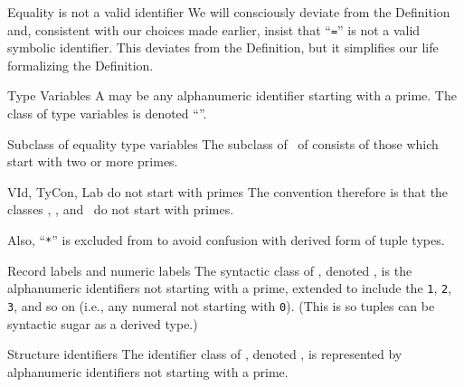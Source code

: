 \begin{deviation}{Equality is not a valid identifier}
We will consciously deviate from the Definition and, consistent with our
choices made earlier, insist that ``\texttt{=}'' is not a valid symbolic
identifier. This deviates from the Definition, but it simplifies our
life formalizing the Definition.
\end{deviation}

\begin{definition}{Type Variables}
A  may be any alphanumeric identifier starting
with a prime. The class of type variables is denoted ``{\TyVar}''.
\end{definition}

\begin{definition}{Subclass of equality type variables}\label{defn:syntax-core:etyvar}
The subclass of  \EtyVar\ of {\TyVar}
consists of those which start with two or more primes.
\end{definition}

\begin{convention}{VId, TyCon, Lab do not start with primes}
The convention therefore is that the classes \VId, \TyCon, and \Lab\ do
not start with primes.

Also, ``\texttt{*}'' is excluded from {\TyCon} to avoid confusion with
derived form of tuple types.
\end{convention}

\begin{definition}{Record labels and numeric labels}\label{defn:record-and-numeric-labels}
The syntactic class of , denoted {\Lab}, is
the alphanumeric identifiers not starting with a prime, extended to
include the  \texttt{1}, \texttt{2}, \texttt{3},
and so on (i.e., any numeral not starting with \texttt{0}).
(This is so tuples can be syntactic sugar as a derived type.)
\end{definition}

\begin{definition}{Structure identifiers}\label{defn:StrId}
The identifier class of , denoted \StrId,
is represented by alphanumeric identifiers not starting with a prime.
\end{definition}

